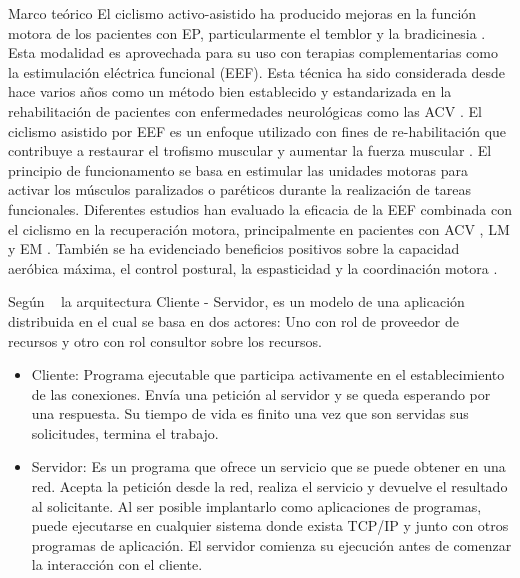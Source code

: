 \begin{thesischapter}{1} {Marco teórico}
    \vspace{5pt}
    El ciclismo activo-asistido ha producido mejoras en la función motora de los pacientes
    con EP, particularmente el temblor y la bradicinesia \cite{ryan2020interval, palomino2021efectividad}. 
    Esta modalidad es
    aprovechada para su uso con terapias complementarias como la estimulación eléctrica
    funcional (EEF). Esta técnica ha sido considerada desde hace varios años como un
    método bien establecido y estandarizada en la rehabilitación de pacientes con
    enfermedades neurológicas como las ACV \cite{rabelo2018overview}. El ciclismo asistido por EEF es un
    enfoque utilizado con fines de re-habilitación que contribuye a restaurar el trofismo
    muscular y aumentar la fuerza muscular \cite{barbosa2015application, ferrante2008cycling}. El principio de funcionamento se basa
    en estimular las unidades motoras para activar los músculos paralizados o paréticos
    durante la realización de tareas funcionales. Diferentes estudios han evaluado la eficacia
    de la EEF combinada con el ciclismo en la recuperación motora, principalmente en
    pacientes con ACV \cite{ambrosini2020does}, LM \cite{casabona2020effects} y EM \cite{pilutti2019functional}. También se ha evidenciado beneficios
    positivos sobre la capacidad aeróbica máxima, el control postural, la espasticidad y la
    coordinación motora \cite{barbosa2015application, rabelo2018overview}.
    


    \vspace{10pt}
    Según ~\cite{moyano2020arquitectura} la arquitectura Cliente - Servidor, es 
    un modelo de una aplicación distribuida en el cual se basa en dos actores:
    Uno con rol de proveedor de recursos y otro con rol consultor sobre los recursos.
    \begin{itemize}
        \item Cliente: Programa ejecutable que participa activamente en el establecimiento de las conexiones. Envía una petición al servidor y se queda
        esperando por una respuesta. Su tiempo de vida es finito una vez que son
        servidas sus solicitudes, termina el trabajo.
        \item Servidor: Es un programa que ofrece un servicio que se puede obtener
        en una red. Acepta la petición desde la red, realiza el servicio y devuelve
        el resultado al solicitante. Al ser posible implantarlo como aplicaciones de
        programas, puede ejecutarse en cualquier sistema donde exista TCP/IP y
        junto con otros programas de aplicación. El servidor comienza su ejecución
        antes de comenzar la interacción con el cliente.
    \end{itemize}


\end{thesischapter}
